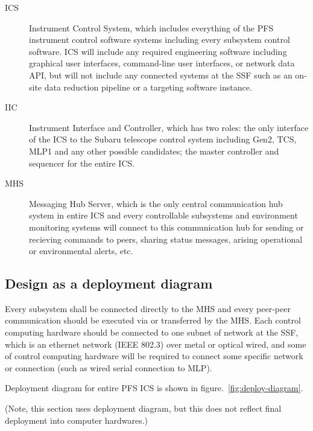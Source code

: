 \documentclass[a4paper,notitlepage]{article}
\begin{document}
\begin{description}
  \item[ICS] Instrument Control System, which includes everything of the 
    PFS instrument control software systems including every subsystem 
    control software. ICS will include any required engineering software 
    including graphical user interfaces, command-line user interfaces, or 
    network data API, but will not include any connected systems at the SSF 
    such as an on-site data reduction pipeline or a targeting software 
    instance. 
  \item[IIC] Instrument Interface and Controller, which has two roles: 
    the only interface of the ICS to the Subaru telescope control system 
    including Gen2, TCS, MLP1 and any other possible candidates; the master 
    controller and sequencer for the entire ICS.
  \item[MHS] Messaging Hub Server, which is the only central communication hub 
    system in entire ICS and every controllable subsystems and environment 
    monitoring systems will connect to this communication hub for sending or 
    recieving commands to peers, sharing status messages, arising operational 
    or environmental alerts, etc.
\end{description}

\subsection{Design as a deployment diagram}

Every subsystem shall be connected directly to the MHS and 
every peer-peer communication should be executed via or transferred by the MHS. 
Each control computing hardware should be connected to one subnet of network 
at the SSF, which is an ethernet network (IEEE 802.3) over metal or optical 
wired, and some of control computing hardware will be required to connect 
some specific network or connection (such as wired serial connection to MLP). 

Deployment diagram for entire PFS ICS is shown in 
figure.~\ref{fig:deploy-diagram}. 

(Note, this section uses deployment diagram, but this does not reflect final 
deployment into computer hardwares.)
\end{document}
